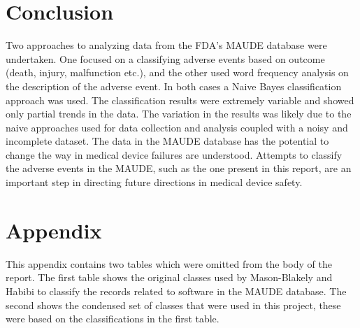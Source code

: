 \documentclass[11pt, notitlepage,abstracton,oneside]{article}   	%
\begin{document}
\section{Conclusion}
Two approaches to analyzing data from the FDA's MAUDE database were undertaken. One focused on a classifying adverse events based on outcome (death, injury, malfunction etc.), and the other used word frequency analysis on the description of the adverse event. In both cases a Naive Bayes classification approach was used. The classification results were extremely variable and showed only partial trends in the data. The variation in the results was likely due to the naive approaches used for data collection and analysis coupled with a noisy and incomplete dataset. The data in the MAUDE database has the potential to change the way in medical device failures are understood. Attempts to classify the adverse events in the MAUDE, such as the one present in this report, are an important step in directing future directions in medical device safety. 
\newpage 
\section{Appendix}
This appendix contains two tables which were omitted from the body of the report. The first table shows the original classes used by Mason-Blakely and Habibi to classify the records related to software in the MAUDE database. The second shows the condensed set of classes that were used in this project, these were based on the classifications in the first table. 
\end{document}
